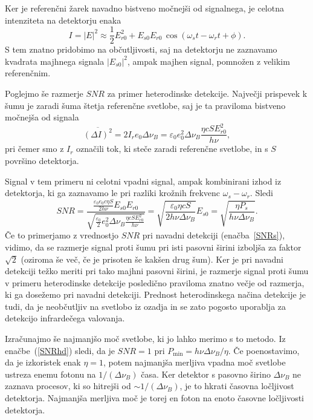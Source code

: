 Ker je referenčni žarek navadno bistveno močnejši od signalnega, je celotna intenziteta
na detektorju enaka
\begin{equation}
I = |E|^2 \approx \frac{1}{2}E_{r0}^2 + E_{s0}E_{r0}\,\cos(\omega_st-\omega_rt+\phi).
\end{equation}
S tem znatno pridobimo na občutljivosti, saj na detektorju ne zaznavamo  
kvadrata majhnega signala $|E_{s0}|^2$, ampak majhen signal, pomnožen z velikim referenčnim. 

Poglejmo še razmerje $SNR$ za primer heterodinske detekcije. Največji prispevek k šumu je 
zaradi šuma štetja referenčne svetlobe, saj je ta praviloma bistveno močnejša od signala
\begin{equation}
\overline{(\Delta I)^2} = 2I_re_0 \Delta\nu_B= \varepsilon_0 
e_0^2\Delta\nu_B\frac{\eta c S E_{r0}^2}{h\nu},
\end{equation}
pri čemer smo z $I_r$ označili tok, ki steče zaradi referenčne svetlobe, in s $S$  
površino detektorja. 

Signal v tem primeru ni celotni vpadni signal, ampak kombinirani izhod iz 
detektorja, ki ga zaznavamo le pri razliki krožnih frekvenc $\omega_s-\omega_r$. Sledi
\begin{equation}
SNR = \frac{\frac{\varepsilon_0 e_0 c \eta S}{2h \nu} E_{s0}E_{r0}}{\sqrt{\frac{\varepsilon_0}{2}
e_0^2 \Delta\nu_B\frac{\eta c S E_{r0}^2}{h\nu}}} = 
\sqrt{\frac{\varepsilon_0\eta c S}{2 h \nu \Delta\nu_B}}E_{s0} = 
\sqrt{\frac{\eta P_s}{h \nu \Delta \nu_B}}.
\label{SNRhd}
\end{equation}
Če to primerjamo z vrednostjo $SNR$ pri navadni detekciji (enačba~\ref{SNRs}), 
vidimo, 
da se razmerje signal proti šumu pri isti pasovni širini izboljša za faktor $\sqrt{2}$
(oziroma še več, če je prisoten še kakšen drug šum).
Ker je pri navadni detekciji težko meriti pri tako majhni pasovni širini, je razmerje
signal proti šumu v primeru heterodinske detekcije posledično praviloma znatno večje
od razmerja, ki ga dosežemo pri navadni detekciji. Prednost heterodinskega 
načina detekcije je tudi, da je neobčutljiv na svetlobo iz ozadja in se 
zato pogosto uporablja za detekcijo infrardečega valovanja.

Izračunajmo še najmanjšo moč svetlobe, ki jo lahko merimo s to metodo. Iz enačbe~(\ref{SNRhd}) 
sledi, da je $SNR=1$ pri $P_{\mathrm{min}} = h\nu \Delta \nu_B/\eta$. Če poenostavimo, da
je izkoristek enak $\eta = 1$, potem najmanjša merljiva vpadna moč svetlobe ustreza
enemu fotonu na $1/(\Delta\nu_B)$ časa. Ker detektor s pasovno širino $\Delta\nu_B$
ne zaznava procesov, ki so hitrejši od $\sim 1/(\Delta\nu_B)$, je to hkrati časovna ločljivost
detektorja. Najmanjša merljiva moč je torej en foton na enoto časovne ločljivosti detektorja.
